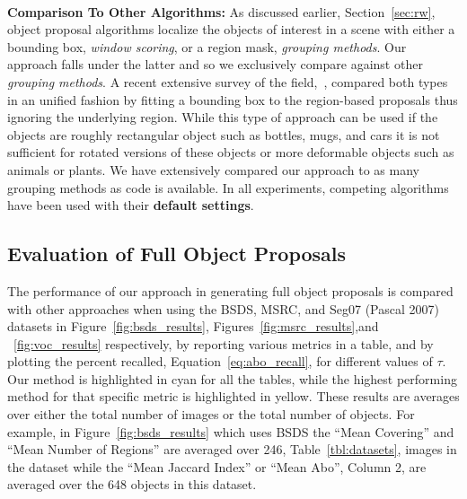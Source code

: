 




\noindent\\
{\bf Comparison To Other Algorithms: } As discussed earlier, Section~\ref{sec:rw}, object proposal algorithms localize the objects of interest in a scene with either a bounding box, \emph{window scoring}, or a region mask, \emph{grouping methods}. Our approach falls under the latter and so we  exclusively compare against other \emph{grouping methods}. A recent extensive survey of the field,~\cite{Hosang:etal:PAMI16}, compared both types in an unified fashion by fitting a bounding box to the region-based proposals thus ignoring the underlying region. While this type of approach can be used if the objects are roughly rectangular object such as bottles, mugs, and cars it is not sufficient for rotated versions of these objects or more deformable objects such as animals or plants. We have extensively compared our approach to as many grouping methods as code is available. In all experiments, competing algorithms have been used with their {\bf default settings}. 

\subsection{Evaluation of Full Object Proposals}

The performance of our approach in generating full object proposals is compared with other approaches when using the BSDS, MSRC, and Seg07 (Pascal 2007) datasets in Figure~\ref{fig:bsds_results}, Figures~\ref{fig:msrc_results},and ~\ref{fig:voc_results} respectively, by reporting various metrics in a table, and by plotting the percent recalled, Equation~\ref{eq:abo_recall}, for different values of $\tau$. Our method is highlighted in cyan for all the tables, while the highest performing method for that specific metric is highlighted in yellow. These results are averages over either the total number of images or the total number of objects. For example, in Figure~\ref{fig:bsds_results} which uses BSDS the ``Mean Covering'' and ``Mean Number of Regions'' are averaged over 246, Table~\ref{tbl:datasets}, images in the dataset while the ``Mean Jaccard Index'' or ``Mean Abo'', Column 2, are averaged over the 648 objects in this dataset. 

